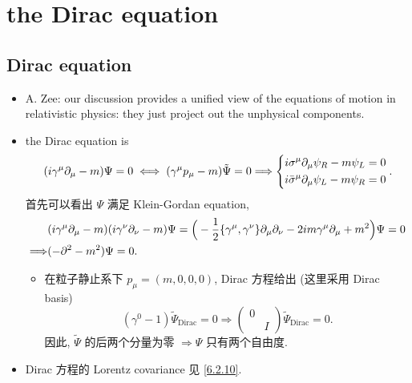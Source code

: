 \chapter{the Dirac equation}
\section{Dirac equation}
\begin{itemize}
	\item A. Zee: our discussion provides a unified view of the equations of motion in relativistic physics: they just project out the unphysical components.
	
	\item the Dirac equation is
	\begin{equation}
		(i \gamma^\mu \partial_\mu - m) \Psi = 0 \iff (\gamma^\mu p_\mu - m) \tilde{\Psi} = 0 \Longrightarrow \begin{dcases}
			i \sigma^\mu \partial_\mu \psi_R - m \psi_L = 0 \\
			i \bar{\sigma}^\mu \partial_\mu \psi_L - m \psi_R = 0
		\end{dcases}.
	\end{equation}
	首先可以看出 $\Psi$ 满足 Klein-Gordan equation,
	\begin{align}
		& (i \gamma^\mu \partial_\mu - m) (i \gamma^\nu \partial_\nu - m) \Psi = \Big( - \frac{1}{2} \{\gamma^\mu, \gamma^\nu\} \partial_\mu \partial_\nu - 2 i m \gamma^\mu \partial_\mu + m^2 \Big) \Psi = 0 \notag \\
		\Longrightarrow & (- \partial^2 - m^2) \Psi = 0.
	\end{align}
	\begin{itemize}
		\item 在粒子静止系下 $p_\mu = (m, 0, 0, 0)$, Dirac 方程给出 (这里采用 Dirac basis)
		\begin{equation}
			(\gamma^0 - 1) \tilde{\Psi}_\text{Dirac} = 0 \Longrightarrow \begin{pmatrix}
				0 & \\
				& I
			\end{pmatrix} \tilde{\Psi}_\text{Dirac} = 0.
		\end{equation}
		因此, $\tilde{\Psi}$ 的后两个分量为零 $\Longrightarrow \Psi$ 只有两个自由度.
	\end{itemize}
	
	\item Dirac 方程的 Lorentz covariance 见 \eqref{6.2.10}.
\end{itemize}

